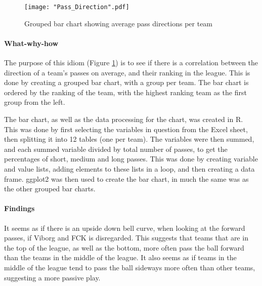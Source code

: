 \documentclass[Report.tex]{subfiles}
\begin{document}
\begin{figure}
\center
\texttt{[image: "Pass\_Direction".pdf]}
\caption{Grouped bar chart showing average pass directions per team}
\label{Fig:Pass_Direction} 
\end{figure}

\paragraph{What-why-how\\}
The purpose of this idiom (Figure \ref{Fig:Pass_Direction}) is to see if there is a correlation between the
direction of a team's passes on average, and their ranking in the league. 
This is done by creating a grouped bar chart, with a group per team. The bar
chart is ordered by the ranking of the team, with the highest ranking team as
the first group from the left.

The bar chart, as well as the data processing for the chart, was created in R.
This was done by first selecting the variables in question from the Excel sheet,
then splitting it into 12 tables (one per team). The variables were then
summed, and each summed variable divided by total number of passes, to get the
percentages of short, medium and long passes. This was done by creating
variable and value lists, adding elements to these lists in a loop, and then
creating a data frame. 
ggplot2 was then used to create the bar chart, in much the same was as the other
grouped bar charts. 

\paragraph{Findings\\}
It seems as if there is an upside down bell curve, when looking at the forward passes,
 if Viborg and FCK is disregarded. This suggests that teams that are in the top of the league, 
as well as the bottom, more often pass the ball forward than the teams in the middle of
 the league. It also seems as if teams in the middle of the league tend to pass the ball sideways
more often than other teams, suggesting a more passive play. 
\end{document}
